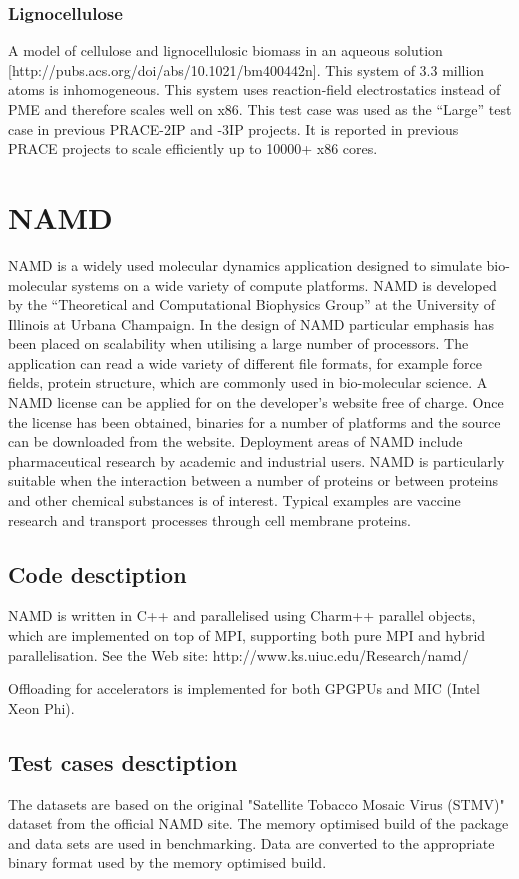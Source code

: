 \subsubsection{Lignocellulose}
A model of cellulose and lignocellulosic biomass in an aqueous solution [http://pubs.acs.org/doi/abs/10.1021/bm400442n]. This system of 3.3 million atoms is inhomogeneous. This system uses reaction-field electrostatics instead of PME and therefore scales well on x86. This test case was used as the “Large” test case in previous PRACE-2IP and -3IP projects. It is reported in previous PRACE projects to scale efficiently up to 10000+ x86 cores.

\section{NAMD}

NAMD is a widely used molecular dynamics application designed to simulate bio-molecular systems on a wide variety of compute platforms. NAMD is developed by the “Theoretical and Computational Biophysics Group” at the University of Illinois at Urbana Champaign. In the design of NAMD particular emphasis has been placed on scalability when utilising a large number of processors. The application can read a wide variety of different file formats, for example force fields, protein structure, which are commonly used in bio-molecular science. A NAMD license can be applied for on the developer’s website free of charge. Once the license has been obtained, binaries for a number of platforms and the source can be downloaded from the website. Deployment areas of NAMD include pharmaceutical research by academic and industrial users. NAMD is particularly suitable when the interaction between a number of proteins or between proteins and other chemical substances is of interest. Typical examples are vaccine research and transport processes through cell membrane proteins.

\subsection{Code desctiption}
NAMD is written in C++ and parallelised using Charm++ parallel objects, which are implemented on top of MPI, supporting both pure MPI and hybrid parallelisation.
See the Web site: http://www.ks.uiuc.edu/Research/namd/

Offloading for accelerators is implemented for both GPGPUs and MIC (Intel Xeon Phi).

\subsection{Test cases desctiption}
The datasets are based on the original "Satellite Tobacco Mosaic Virus (STMV)" dataset from the official NAMD site. The memory optimised build of the package and data sets are used in benchmarking. Data are converted to the appropriate binary format used by the memory optimised build.

